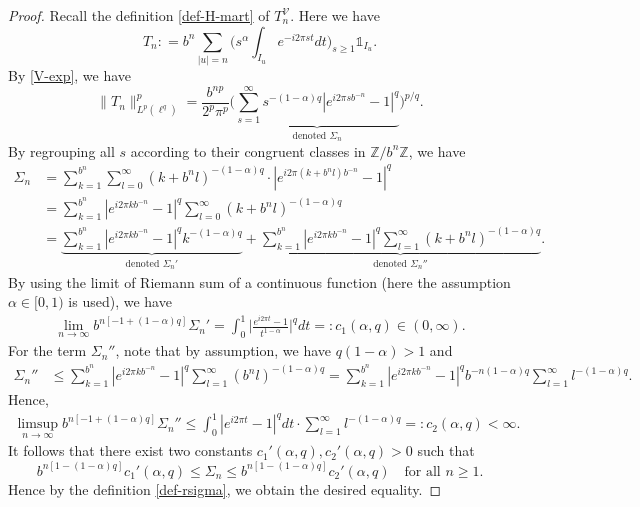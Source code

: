 \documentclass[12pt]{amsart}
\theoremstyle{definition}
\theoremstyle{remark}
\newcommand{\Z}{\mathbb{Z}}
\newcommand{\indi}{\mathds{1}}
\numberwithin{equation}{section}
\begin{document}
\begin{proof}
Recall the definition \eqref{def-H-mart} of $T_n^\mathcal{V}$. Here we have 
\[
T_n : =   b^n \sum_{|u|=n}      \Big(  s^\alpha   \int_{I_u}  e^{-i 2 \pi s t}dt\Big)_{s \ge 1}  \indi_{I_u}.
\]
By \eqref{V-exp}, we have 
\[
\|T_n\|^p_{L^p(\ell^q)} = \frac{b^{np}}{2^p \pi^p} \Big( \underbrace{ \sum_{s=1}^\infty     s^{-(1-\alpha)q}  | e^{i 2 \pi sb^{-n}} - 1 |^q}_{\text{denoted $\Sigma_n$}}\Big)^{p/q}. 
\]
By regrouping all $s$ according to their congruent classes in $\Z/b^n\Z$, we have 
\begin{align*}
\Sigma_n &= \sum_{k=1}^{b^n}     \sum_{l=0}^\infty (k+b^n l )^{-(1-\alpha)q} \cdot | e^{i 2 \pi (k+b^nl)b^{-n}} - 1 |^q 
\\
& = \sum_{k=1}^{b^n} | e^{i 2 \pi k b^{-n}} - 1 |^q  \sum_{l=0}^\infty (k+b^n l)^{-(1-\alpha)q}
\\
&= \underbrace{\sum_{k=1}^{b^n} | e^{i 2 \pi k b^{-n}} - 1 |^q  k^{-(1-\alpha)q} }_{\text{denoted $\Sigma_n'$}}  + \underbrace{ \sum_{k=1}^{b^n} | e^{i 2 \pi k b^{-n}} - 1 |^q  \sum_{l=1}^\infty (k+b^n l)^{-(1-\alpha)q}}_{\text{denoted $\Sigma_n''$}}.
\end{align*}
By using the limit of Riemann sum of a continuous function (here the assumption $\alpha\in [0,1)$ is used), we have 
\begin{align*}
\lim_{n\to\infty} b^{n [ -1+ (1-\alpha)q]}   \Sigma_n' 
= \int_0^1   \Big|\frac{ e^{i 2 \pi t } - 1}{t^{1-\alpha}} \Big|^q dt  = :c_1(\alpha, q)\in (0,\infty).
\end{align*}
For the term $\Sigma_n''$, note that by assumption,  we have $q(1-\alpha)>1$ and 
\begin{align*}
  \Sigma_n''& \le   \sum_{k=1}^{b^n} | e^{i 2 \pi k b^{-n}} - 1 |^q  \sum_{l=1}^\infty (b^n l)^{-(1-\alpha)q} =  \sum_{k=1}^{b^n} | e^{i 2 \pi k b^{-n}} - 1 |^q    b^{-n(1-\alpha)q} \sum_{l=1}^\infty l^{-(1-\alpha)q}.
\end{align*}
Hence, 
\begin{align*}
\limsup_{n\to\infty} b^{n [ -1+ (1-\alpha)q]}  \Sigma_n'' \le     \int_0^1 | e^{i 2 \pi t} - 1 |^q    dt \cdot  \sum_{l=1}^\infty l^{-(1-\alpha)q} =: c_2(\alpha, q)<\infty. 
\end{align*}
It follows that there exist two constants $c_1'(\alpha,q), c_2'(\alpha,q)>0$ such that   
\[
 b^{n [ 1 -(1-\alpha)q]}   c_1'(\alpha, q)\le \Sigma_n \le  b^{n [ 1 -(1-\alpha)q]}   c_2'(\alpha, q) \quad \text{for all $n\ge 1$}.
\]
Hence by the definition \eqref{def-rsigma}, we obtain  the desired equality.
\end{proof}
\end{document}
